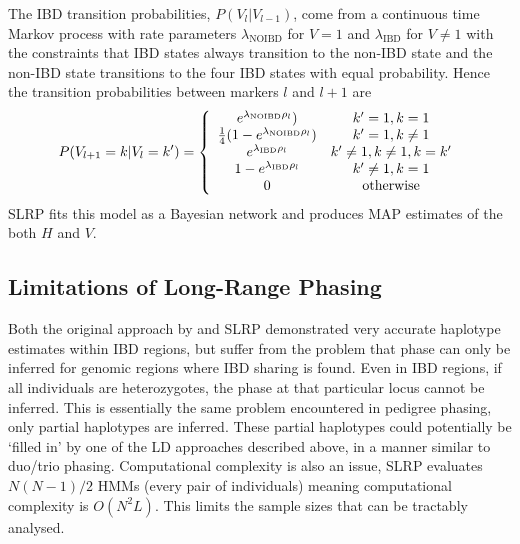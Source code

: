 The IBD transition probabilities, $P(V_l|V_{l-1})$, come from a continuous time Markov process with rate parameters $\lambda_\textrm{NOIBD}$ for $V=1$ and $\lambda_\textrm{IBD}$ for $V\neq1$ with the constraints that IBD states always transition to the non-IBD state and the non-IBD state transitions to the four IBD states with equal probability.  Hence the transition probabilities between markers $l$ and $l+1$ are 
\[ P(V_{l+1}=k|V_l=k') = \left\{
\begin{array}{c c} 
  e^{\lambda_\textrm{NOIBD} \rho_l}) & k'=1,k = 1 \\
  \frac{1}{4}(1-e^{\lambda_\textrm{NOIBD} \rho_l}) & k'=1,k \neq 1 \\
   e^{\lambda_\textrm{IBD} \rho_l} & k'\neq1,k\neq1,k=k' \\
  1- e^{\lambda_\textrm{IBD}\rho_l} & k'\neq1,k= 1 \\
  0   &  \textrm{otherwise} \\
\end{array}  
\right.\]
SLRP fits this model as a Bayesian network and produces MAP estimates of the both $H$ and $V$.  


\subsection{Limitations of Long-Range Phasing}Both the original approach by \cite{kong2008detection} and SLRP  demonstrated very accurate haplotype estimates within IBD regions, but suffer from the problem that phase can only be inferred for genomic regions where IBD sharing is found.  Even in IBD regions, if all individuals are heterozygotes, the phase at that particular locus cannot be inferred.  This is essentially the same problem encountered in pedigree phasing, only partial haplotypes are inferred.  These partial haplotypes could potentially be `filled in' by one of the LD approaches described above, in a manner similar to duo/trio phasing.  Computational complexity is also an issue, SLRP evaluates $N(N-1)/2$ HMMs (every pair of individuals) meaning computational complexity is $O(N^2L)$. This limits the sample sizes that can be tractably analysed.

